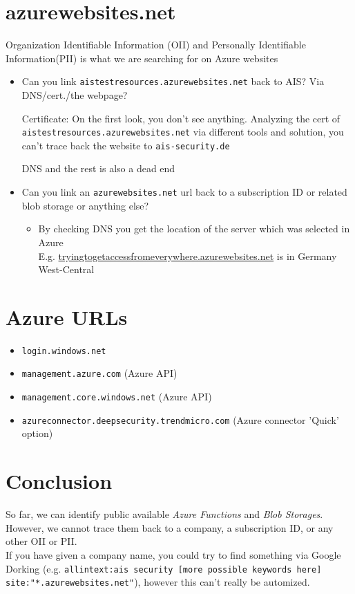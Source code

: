 \documentclass[12pt]{article}
\begin{document}
\section*{azurewebsites.net}
Organization Identifiable Information (OII) and Personally Identifiable Information(PII) is what we are searching for on Azure websites
\begin{itemize}
    \item Can you link \verb|aistestresources.azurewebsites.net| back to AIS? Via DNS/cert./the webpage? 
    
    Certificate: On the first look, you don't see anything. Analyzing the cert of \verb|aistestresources.azurewebsites.net| via different tools and solution, you can't trace back the website to \verb|ais-security.de|

    DNS and the rest is also a dead end
    
    \item Can you link an \verb|azurewebsites.net| url back to a subscription ID or related blob storage or anything else? 
    \begin{itemize}
        \item By checking DNS you get the location of the server which was selected in Azure \\
        E.g. \url{tryingtogetaccessfromeverywhere.azurewebsites.net} is in Germany West-Central
    \end{itemize}

\end{itemize}


\section*{Azure URLs}
\begin{itemize}
	\item \verb|login.windows.net|
	\item \verb|management.azure.com| (Azure API)
	\item \verb|management.core.windows.net| (Azure API)
	\item \verb|azureconnector.deepsecurity.trendmicro.com| (Azure connector 'Quick' option)
\end{itemize}


\section*{Conclusion}
So far, we can identify public available \textit{Azure Functions} and \textit{Blob Storages}. However, we cannot trace them back to a company, a subscription ID, or any other OII or PII.\\
If you have given a company name, you could try to find something via Google Dorking (e.g. \verb|allintext:ais security [more possible keywords here] site:"*.azurewebsites.net"|), however this can't really be automized.
\end{document}
